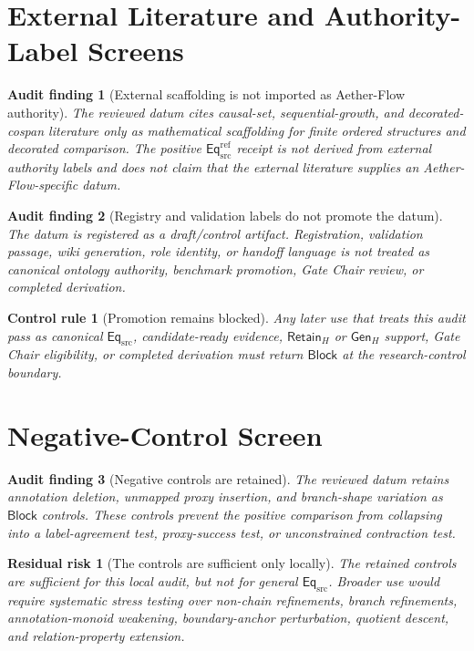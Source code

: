 \documentclass[11pt]{article}
\newcommand{\EqSrc}{\mathsf{Eq}_{\mathrm{src}}}
\newcommand{\EqRef}{\mathsf{Eq}_{\mathrm{src}}^{\mathrm{ref}}}
\newcommand{\RetainH}{\mathsf{Retain}_{H}}
\newcommand{\GenH}{\mathsf{Gen}_{H}}
\newcommand{\Block}{\mathsf{Block}}
\newtheorem{auditfinding}{Audit finding}
\newtheorem{residualrisk}{Residual risk}
\newtheorem{controlrule}{Control rule}
\begin{document}
\section{External Literature and Authority-Label Screens}

\begin{auditfinding}[External scaffolding is not imported as Aether-Flow authority]
The reviewed datum cites causal-set, sequential-growth, and
decorated-cospan literature only as mathematical scaffolding for finite
ordered structures and decorated comparison. The positive \(\EqRef\)
receipt is not derived from external authority labels and does not claim
that the external literature supplies an Aether-Flow-specific datum.
\end{auditfinding}

\begin{auditfinding}[Registry and validation labels do not promote the datum]
The datum is registered as a draft/control artifact. Registration,
validation passage, wiki generation, role identity, or handoff language
is not treated as canonical ontology authority, benchmark promotion,
Gate Chair review, or completed derivation.
\end{auditfinding}

\begin{controlrule}[Promotion remains blocked]
Any later use that treats this audit pass as canonical \(\EqSrc\),
candidate-ready evidence, \(\RetainH\) or \(\GenH\) support, Gate Chair
eligibility, or completed derivation must return \(\Block\) at the
research-control boundary.
\end{controlrule}

\section{Negative-Control Screen}

\begin{auditfinding}[Negative controls are retained]
The reviewed datum retains annotation deletion, unmapped proxy insertion,
and branch-shape variation as \(\Block\) controls. These controls prevent
the positive comparison from collapsing into a label-agreement test,
proxy-success test, or unconstrained contraction test.
\end{auditfinding}

\begin{residualrisk}[The controls are sufficient only locally]
The retained controls are sufficient for this local audit, but not for
general \(\EqSrc\). Broader use would require systematic stress testing
over non-chain refinements, branch refinements, annotation-monoid
weakening, boundary-anchor perturbation, quotient descent, and
relation-property extension.
\end{residualrisk}
\end{document}
